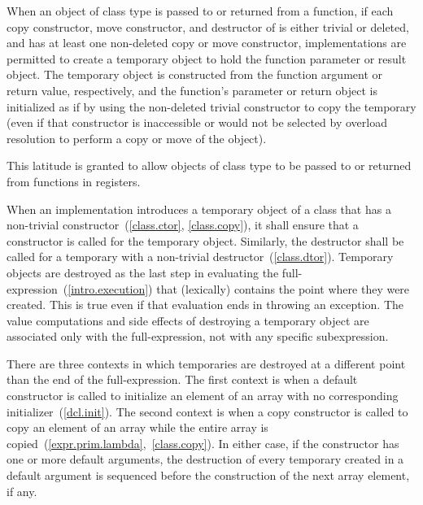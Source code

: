 \pnum
When an object of class type 
is passed to or returned from a function,
if each copy constructor, move constructor, and destructor of 
is either trivial or deleted,
and 
has at least one non-deleted copy or move constructor,
implementations are permitted
to create a temporary object
to hold the function parameter or result object.
The temporary object is constructed
from the function argument or return value, respectively,
and the function's parameter or return object
is initialized as if by
using the non-deleted trivial constructor to copy the temporary
(even if that constructor is inaccessible
or would not be selected by overload resolution
to perform a copy or move of the object).
\begin{note}
This latitude is granted to allow objects of class type to be passed to or returned from functions in registers.
\end{note}

\pnum
{}%
%
%
When an implementation introduces a temporary object of a class that has a
non-trivial constructor~(\ref{class.ctor}, \ref{class.copy}), it shall ensure that
a constructor is called for the temporary object.
Similarly, the destructor shall be called for a temporary with a non-trivial
destructor~(\ref{class.dtor}).
Temporary objects are destroyed as the last step
in evaluating
the full-expression~(\ref{intro.execution})
that (lexically) contains the point where
they were created.
This is true even if that evaluation ends in throwing an exception.
The
%
value computations and
%
side effects of destroying a temporary object
are associated only with the full-expression, not with any specific
subexpression.

\pnum
{}%
%
There are three contexts in which temporaries are destroyed at a different
point than the end of the full-expression.
The first context is when a default constructor is called to initialize
an element of an array with no corresponding initializer~(\ref{dcl.init}).
The second context is when a copy constructor is called to copy an element of
an array while the entire array is copied~(\ref{expr.prim.lambda},~\ref{class.copy}).
In either case, if the constructor has one or more default arguments,
the destruction of every temporary created in a default argument is
sequenced before the construction of the next array element, if any.


